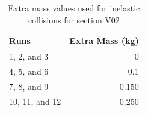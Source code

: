 \begin{table}[ht]
    \centering
    \begin{tabular}{|l|r|}
        \hline
        Runs & Extra Mass (kg) \\
        \hline
        1, 2, and 3 & 0 \\
        4, 5, and 6 & 0.1 \\
        7, 8, and 9 & 0.150 \\
        10, 11, and 12 & 0.250 \\
        \hline
    \end{tabular}
    \caption{Extra mass values used for inelastic collisions for section V02}
    \label{table:08.inelastic.mass.v02}
\end{table}
\newpage
\FloatBarrier
